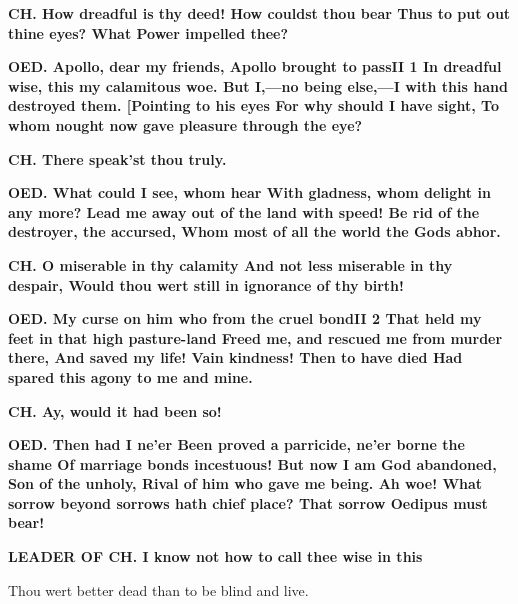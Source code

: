 \documentclass[11pt,letter]{book}
\begin{document}
\par \textbf{CH. How dreadful is thy deed! How couldst thou bear Thus to put out thine eyes? What Power impelled thee?}
\par 

\par \textbf{OED. Apollo, dear my friends, Apollo brought to passII 1 In dreadful wise, this my calamitous woe. But I,—no being else,—I with this hand destroyed them. [Pointing to his eyes For why should I have sight, To whom nought now gave pleasure through the eye?}
\par 

\par \textbf{CH. There speak’st thou truly.}
\par 

\par \textbf{OED. What could I see, whom hear With gladness, whom delight in any more? Lead me away out of the land with speed! Be rid of the destroyer, the accursed, Whom most of all the world the Gods abhor.}
\par 

\par \textbf{CH. O miserable in thy calamity And not less miserable in thy despair, Would thou wert still in ignorance of thy birth!}
\par 

\par \textbf{OED. My curse on him who from the cruel bondII 2 That held my feet in that high pasture-land Freed me, and rescued me from murder there, And saved my life! Vain kindness! Then to have died Had spared this agony to me and mine.}
\par 

\par \textbf{CH. Ay, would it had been so!}
\par 

\par \textbf{OED. Then had I ne’er Been proved a parricide, ne’er borne the shame Of marriage bonds incestuous! But now I am God abandoned, Son of the unholy, Rival of him who gave me being. Ah woe! What sorrow beyond sorrows hath chief place? That sorrow Oedipus must bear!}
\par 

\par \textbf{LEADER OF CH. I know not how to call thee wise in this}
\par   Thou wert better dead than to be blind and live.
\end{document}
